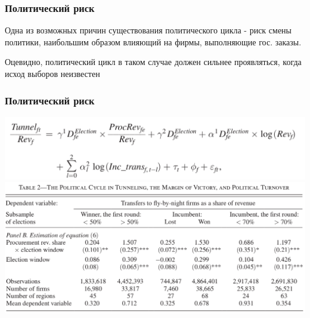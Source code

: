 \begin{frame}
\frametitle{Политический риск}
Одна из возможных причин существования политического цикла - риск смены политики, наибольшим образом влияющий на фирмы, выполняющие гос. заказы.\\
\vspace{3mm}

Оцевидно, политический цикл в таком случае должен сильнее проявляться, когда исход выборов неизвестен\\
\vspace{3mm}
\end{frame}

\begin{frame}
\frametitle{Политический риск}
\includegraphics[scale=0.25]{images/prisk1}
\includegraphics[scale=0.25]{images/prisk2}
\end{frame}